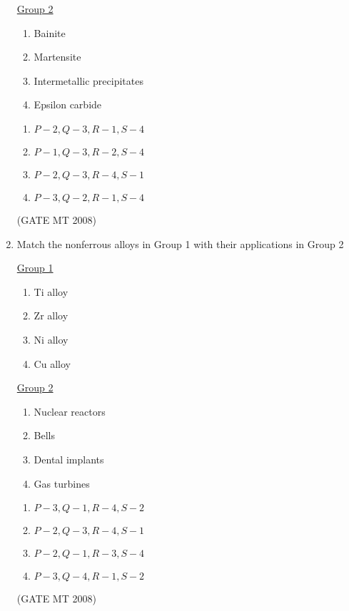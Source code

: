 \documentclass[11pt, letterpaper]{article}
\theoremstyle{remark}
\begin{document}
\begin{enumerate}[label=Q.\arabic*]
\begin{multicols}{2}
     \underline{Group 2}
    \begin{enumerate}[label=(\arabic*), start=1]
        \item Bainite
        \item Martensite
        \item Intermetallic precipitates
        \item Epsilon carbide
    \end{enumerate}
\end{multicols}
\vspace{-2em}
    \begin{multicols}{2}
        \begin{enumerate}[label=(\MakeUppercase{\alph*})]
            \item $P-2, Q-3, R-1, S-4$
            \item $P-1, Q-3, R-2, S-4$
            \item $P-2, Q-3, R-4, S-1$
            \item $P-3, Q-2, R-1, S-4$
        \end{enumerate}
    \end{multicols}
    \vspace{-5mm}
   \hfill(GATE MT 2008) 
   
\item Match the nonferrous alloys in Group 1 with their applications in Group 2
 \begin{multicols}{2}
    \underline{Group 1}
    \begin{enumerate}[label=(\Alph*), start=16]
        \item Ti alloy
        \item Zr alloy
        \item Ni alloy
        \item Cu alloy
    \end{enumerate}

     \underline{Group 2}
    \begin{enumerate}[label=(\arabic*), start=1]
        \item Nuclear reactors
        \item Bells
        \item Dental implants 
        \item Gas turbines
    \end{enumerate}
\end{multicols}
\vspace{-2em}   
    \begin{multicols}{2}
        \begin{enumerate}[label=(\MakeUppercase{\alph*})]
            \item $P-3, Q-1, R-4, S-2$
            \item $P-2, Q-3, R-4, S-1$
            \item $P-2, Q-1, R-3, S-4$
            \item $P-3, Q-4, R-1, S-2$
        \end{enumerate}
    \end{multicols}
  \hfill(GATE MT 2008) 
  

\end{enumerate}
\end{document}
